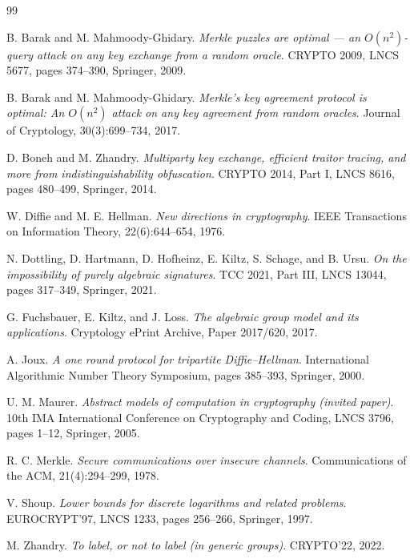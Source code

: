 \documentclass{aicr-conjecture}
\begin{document}
\begin{aicrbibliography}{99}

B. Barak and M. Mahmoody-Ghidary.
\emph{Merkle puzzles are optimal --- an $O(n^{2})$-query attack on any
key exchange from a random oracle}.
CRYPTO 2009, LNCS 5677, pages 374--390, Springer, 2009.

B. Barak and M. Mahmoody-Ghidary.
\emph{Merkle's key agreement protocol is optimal: An $O(n^{2})$ attack
on any key agreement from random oracles}.
Journal of Cryptology, 30(3):699--734, 2017.

D. Boneh and M. Zhandry.
\emph{Multiparty key exchange, efficient traitor tracing, and more from
indistinguishability obfuscation}.
CRYPTO 2014, Part I, LNCS 8616, pages 480--499, Springer, 2014.

W. Diffie and M. E. Hellman.
\emph{New directions in cryptography}.
IEEE Transactions on Information Theory, 22(6):644--654, 1976.

N. Dottling, D. Hartmann, D. Hofheinz, E. Kiltz, S. Schage, and B. Ursu.
\emph{On the impossibility of purely algebraic signatures}.
TCC 2021, Part III, LNCS 13044, pages 317--349, Springer, 2021.

G. Fuchsbauer, E. Kiltz, and J. Loss.
\emph{The algebraic group model and its applications}.
Cryptology ePrint Archive, Paper 2017/620, 2017.

A. Joux.
\emph{A one round protocol for tripartite Diffie--Hellman}.
International Algorithmic Number Theory Symposium, pages 385--393,
Springer, 2000.

U. M. Maurer.
\emph{Abstract models of computation in cryptography (invited paper)}.
10th IMA International Conference on Cryptography and Coding, LNCS 3796,
pages 1--12, Springer, 2005.

R. C. Merkle.
\emph{Secure communications over insecure channels}.
Communications of the ACM, 21(4):294--299, 1978.

V. Shoup.
\emph{Lower bounds for discrete logarithms and related problems}.
EUROCRYPT'97, LNCS 1233, pages 256--266, Springer, 1997.

M. Zhandry.
\emph{To label, or not to label (in generic groups)}.
CRYPTO'22, 2022.

\end{aicrbibliography}
\end{document}
